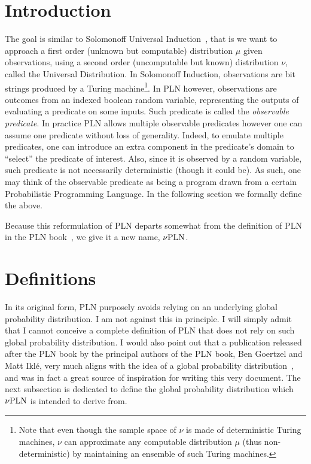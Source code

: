 \documentclass[]{article}
\begin{document}
\section{Introduction}
The goal is similar to Solomonoff Universal Induction~\cite{Solomonoff1964},
that is we want to approach a first order (unknown but computable)
distribution $\mu$ given observations, using a second order
(uncomputable but known) distribution $\nu$, called the Universal
Distribution.  In Solomonoff Induction, observations are bit strings
produced by a Turing machine\footnote{Note that even though the sample
space of $\nu$ is made of deterministic Turing machines, $\nu$ can
approximate any computable distribution $\mu$ (thus non-deterministic)
by maintaining an ensemble of such Turing machines.}.  In PLN however,
observations are outcomes from an indexed boolean random variable,
representing the outputs of evaluating a predicate on some inputs.
Such predicate is called the \emph{observable predicate}.  In practice
PLN allows multiple observable predicates however one can assume one
predicate without loss of generality.  Indeed, to emulate multiple
predicates, one can introduce an extra component in the predicate's
domain to ``select'' the predicate of interest.  Also, since it is
observed by a random variable, such predicate is not necessarily
deterministic (though it could be).  As such, one may think of the
observable predicate as being a program drawn from a certain
Probabilistic Programming Language.  In the following section we
formally define the above.

Because this reformulation of PLN departs somewhat from the definition
of PLN in the PLN book~\cite{goertzel2009pln}, we give it a new name, $\nu\textup{PLN}$.

\section{Definitions}
In its original form, PLN purposely avoids relying on an underlying
global probability distribution.  I am not against this in principle.
I will simply admit that I cannot conceive a complete definition of
PLN that does not rely on such global probability distribution.  I
would also point out that a publication released after the PLN book by
the principal authors of the PLN book, Ben Goertzel and Matt Ikl\'{e},
very much aligns with the idea of a global probability
distribution~\cite{goertzel2025intensional}, and was in fact a great source of
inspiration for writing this very document.  The next subsection is
dedicated to define the global probability distribution which $\nu\textup{PLN}$
is intended to derive from.
\end{document}
